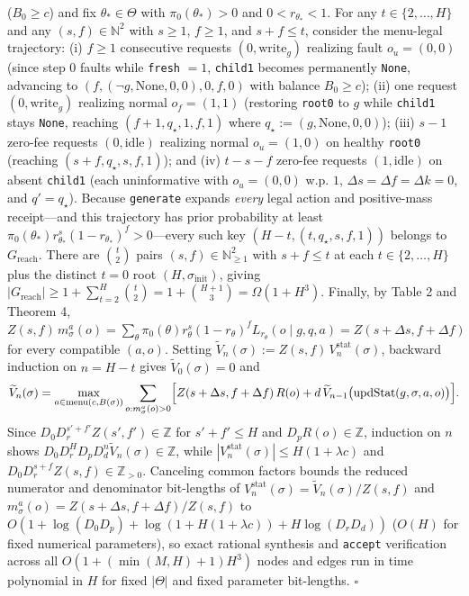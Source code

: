 \documentclass[11pt,letterpaper]{article}
\begin{document}
(\(B_0 \ge c\)) and fix \(\theta_* \in \Theta\) with
\(\pi_0(\theta_*) > 0\) and \(0 < r_{\theta_*} < 1\). For any
\(t \in \{2, \dots, H\}\) and any \((s, f) \in \mathbb{N}^2\) with
\(s \ge 1\), \(f \ge 1\), and \(s + f \le t\), consider the menu-legal
trajectory: (i) \(f \ge 1\) consecutive requests
\((0, \mathrm{write}_g)\) realizing fault \(o_u = (0,0)\) (since step
\(0\) faults while \texttt{fresh} \(= 1\), \texttt{child1} becomes
permanently \texttt{None}, advancing to
\((f, (\neg g, \mathrm{None}, 0, 0), 0, f, 0)\) with balance
\(B_0 \ge c\)); (ii) one request \((0, \mathrm{write}_g)\) realizing
normal \(o_f = (1,1)\) (restoring \texttt{root0} to \(g\) while
\texttt{child1} stays \texttt{None}, reaching
\((f+1, q_\star, 1, f, 1)\) where
\(q_\star := (g, \mathrm{None}, 0, 0)\)); (iii) \(s - 1\) zero-fee
requests \((0, \mathrm{idle})\) realizing normal \(o_u = (1,0)\) on
healthy \texttt{root0} (reaching \((s+f, q_\star, s, f, 1)\)); and (iv)
\(t - s - f\) zero-fee requests \((1, \mathrm{idle})\) on absent
\texttt{child1} (each uninformative with \(o_u = (0,0)\) w.p. \(1\),
\(\Delta s = \Delta f = \Delta k = 0\), and \(q' = q_\star\)). Because
\texttt{generate} expands \emph{every} legal action and positive-mass
receipt---and this trajectory has prior probability at least
\(\pi_0(\theta_*) r_{\theta_*}^s (1 - r_{\theta_*})^f > 0\)---every such
key \((H - t, (t, q_\star, s, f, 1))\) belongs to
\(G_{\mathrm{reach}}\). There are \(\binom{t}{2}\) pairs
\((s, f) \in \mathbb{N}_{\ge 1}^2\) with \(s + f \le t\) at each
\(t \in \{2, \dots, H\}\) plus the distinct \(t = 0\) root
\((H, \sigma_{\mathrm{init}})\), giving
\(|G_{\mathrm{reach}}| \ge 1 + \sum_{t=2}^H \binom{t}{2} = 1 + \binom{H+1}{3} = \Omega(1 + H^3)\).
Finally, by Table 2 and Theorem 4,
\(Z(s,f)\,m_\sigma^a(o) = \sum_\theta \pi_0(\theta) r_\theta^s(1 - r_\theta)^f L_{r_\theta}(o \mid g, q, a) = Z(s + \Delta s, f + \Delta f)\)
for every compatible \((a, o)\). Setting
\(\widetilde{V}_n(\sigma) := Z(s,f)\,V_n^{\mathrm{stat}}(\sigma)\),
backward induction on \(n = H - t\) gives
\(\widetilde{V}_0(\sigma) = 0\) and
\[\widetilde{V}_n(\sigma) = \max_{a \in \mathrm{menu}(c, B(\sigma))} \sum_{o : m_\sigma^a(o) > 0} \Bigl[Z(s + \Delta s, f + \Delta f)\,R(o) + d\,\widetilde{V}_{n-1}\bigl(\mathrm{updStat}(g, \sigma, a, o)\bigr)\Bigr].\]
Since \(D_0 D_r^{s' + f'} Z(s', f') \in \mathbb{Z}\) for
\(s' + f' \le H\) and \(D_p R(o) \in \mathbb{Z}\), induction on \(n\)
shows \(D_0 D_r^H D_p D_d^n \widetilde{V}_n(\sigma) \in \mathbb{Z}\),
while \(|V_n^{\mathrm{stat}}(\sigma)| \le H(1 + \lambda c)\) and
\(D_0 D_r^{s+f} Z(s,f) \in \mathbb{Z}_{>0}\). Canceling common factors
bounds the reduced numerator and denominator bit-lengths of
\(V_n^{\mathrm{stat}}(\sigma) = \widetilde{V}_n(\sigma)/Z(s,f)\) and
\(m_\sigma^a(o) = Z(s+\Delta s, f+\Delta f)/Z(s,f)\) to
\(O(1 + \log(D_0 D_p) + \log(1 + H(1 + \lambda c)) + H\log(D_r D_d))\)
(\(O(H)\) for fixed numerical parameters), so exact rational synthesis
and \texttt{accept} verification across all
\(O(1 + (\min(M, H) + 1)H^3)\) nodes and edges run in time polynomial in
\(H\) for fixed \(|\Theta|\) and fixed parameter bit-lengths.
\(\square\)
\end{document}
